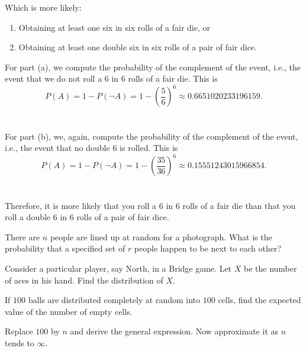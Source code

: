 \begin{problem}[Handout 1, \# 12]
  Which is more likely:
  \begin{enumerate}[label=(\alph*),noitemsep]
  \item Obtaining at least one six in six rolls of a fair die, or
  \item Obtaining at least one double six in six rolls of a pair of fair
    dice.
  \end{enumerate}
\end{problem}
\begin{solution*}
  For part (a), we compute the probability of the complement of the event,
  i.e., the event that we do not roll a \(6\) in \(6\) rolls of a fair
  die. This is
  \[
    P(A)=1-P(\lnot
    A)=1-\left(\frac{5}{6}\right)^6\approx\num{0.6651020233196159}.
  \]
  \\\\
  For part (b), we, again, compute the probability of the complement of the
  event, i.e., the event that no double \(6\) is rolled. This is
  \[
    P(A)=1-P(\lnot
    A)=1-\left(\frac{35}{36}\right)^6\approx\num{0.15551243015966854}.
  \]
  \\\\
  Therefore, it is more likely that you roll a \(6\) in \(6\) rolls of a
  fair die than that you roll a double \(6\) in \(6\) rolls of a pair of
  fair dice.
\end{solution*}

\begin{problem}[Handout 1, \# 13]
  There are \(n\) people are lined up at random for a photograph. What is
  the probability that a specified set of \(r\) people happen to be next to
  each other?
\end{problem}
\begin{solution*}
\end{solution*}

\begin{problem}[Handout 1, \# 16]
  Consider a particular player, say North, in a Bridge game. Let \(X\) be
  the number of aces in his hand. Find the distribution of \(X\).
\end{problem}
\begin{solution*}
\end{solution*}

\begin{problem}[Handout 1, \# 20]
  If \(100\) balls are distributed completely at random into \(100\) cells,
  find the expected value of the number of empty cells.

  \noindent Replace \(100\) by \(n\) and derive the general expression. Now
  approximate it as \(n\) tends to \(\infty\).
\end{problem}
\begin{solution*}
\end{solution*}


